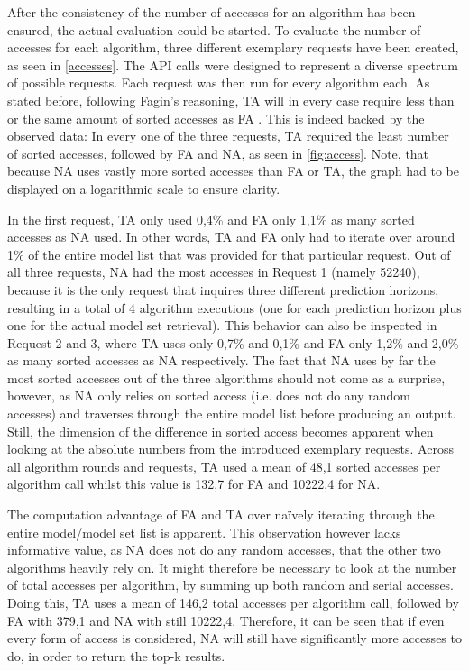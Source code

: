 After the consistency of the number of accesses for an algorithm has been ensured, the actual evaluation could be started. To evaluate the number of accesses for each algorithm, three different exemplary requests have been created, as seen in \autoref{accesses}. The API calls were designed to represent a diverse spectrum of possible requests. Each request was then run for every algorithm each. As stated before, following Fagin’s reasoning, TA will in every case require less than or the same amount of sorted accesses as FA \cite{fagin2002}. This is indeed backed by the observed data: In every one of the three requests, TA required the least number of sorted accesses, followed by FA and NA, as seen in \autoref{fig:access}. Note, that because NA uses vastly more sorted accesses than FA or TA, the graph had to be displayed on a logarithmic scale to ensure clarity. 

In the first request, TA only used 0,4\% and FA only 1,1\% as many sorted accesses as NA used. In other words, TA and FA only had to iterate over around 1\% of the entire model list that was provided for that particular request. Out of all three requests, NA had the most accesses in Request 1 (namely 52240), because it is the only request that inquires three different prediction horizons, resulting in a total of 4 algorithm executions (one for each prediction horizon plus one for the actual model set retrieval). This behavior can also be inspected in Request 2 and 3, where TA uses only 0,7\% and 0,1\% and FA only 1,2\% and 2,0\% as many sorted accesses as NA respectively. The fact that NA uses by far the most sorted accesses out of the three algorithms should not come as a surprise, however, as NA only relies on sorted access (i.e. does not do any random accesses) and traverses through the entire model list before producing an output. Still, the dimension of the difference in sorted access becomes apparent when looking at the absolute numbers from the introduced exemplary requests. Across all algorithm rounds and requests, TA used a mean of 48,1 sorted accesses per algorithm call whilst this value is 132,7 for FA and 10222,4 for NA.

The computation advantage of FA and TA over naïvely iterating through the entire model/model set list is apparent. This observation however lacks informative value, as NA does not do any random accesses, that the other two algorithms heavily rely on. It might therefore be necessary to look at the number of total accesses per algorithm, by summing up both random and serial accesses. Doing this, TA uses a mean of 146,2 total accesses per algorithm call, followed by FA with 379,1 and NA with still 10222,4. Therefore, it can be seen that if even every form of access is considered, NA will still have significantly more accesses to do, in order to return the top-k results. 

